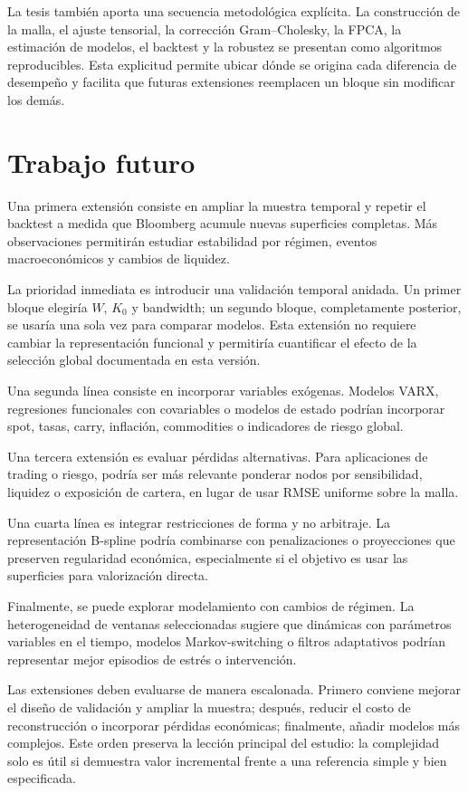 \documentclass[a4paper,11pt]{article}
\begin{document}
La tesis también aporta una secuencia metodológica explícita. La construcción de la malla, el ajuste tensorial, la corrección Gram--Cholesky, la FPCA, la estimación de modelos, el backtest y la robustez se presentan como algoritmos reproducibles. Esta explicitud permite ubicar dónde se origina cada diferencia de desempeño y facilita que futuras extensiones reemplacen un bloque sin modificar los demás.

\section{Trabajo futuro}

Una primera extensión consiste en ampliar la muestra temporal y repetir el backtest a medida que Bloomberg acumule nuevas superficies completas. Más observaciones permitirán estudiar estabilidad por régimen, eventos macroeconómicos y cambios de liquidez.

La prioridad inmediata es introducir una validación temporal anidada. Un primer bloque elegiría \(W\), \(K_0\) y bandwidth; un segundo bloque, completamente posterior, se usaría una sola vez para comparar modelos. Esta extensión no requiere cambiar la representación funcional y permitiría cuantificar el efecto de la selección global documentada en esta versión.

Una segunda línea consiste en incorporar variables exógenas. Modelos VARX, regresiones funcionales con covariables o modelos de estado podrían incorporar spot, tasas, carry, inflación, commodities o indicadores de riesgo global.

Una tercera extensión es evaluar pérdidas alternativas. Para aplicaciones de trading o riesgo, podría ser más relevante ponderar nodos por sensibilidad, liquidez o exposición de cartera, en lugar de usar RMSE uniforme sobre la malla.

Una cuarta línea es integrar restricciones de forma y no arbitraje. La representación B-spline podría combinarse con penalizaciones o proyecciones que preserven regularidad económica, especialmente si el objetivo es usar las superficies para valorización directa.

Finalmente, se puede explorar modelamiento con cambios de régimen. La heterogeneidad de ventanas seleccionadas sugiere que dinámicas con parámetros variables en el tiempo, modelos Markov-switching o filtros adaptativos podrían representar mejor episodios de estrés o intervención.

Las extensiones deben evaluarse de manera escalonada. Primero conviene mejorar el diseño de validación y ampliar la muestra; después, reducir el costo de reconstrucción o incorporar pérdidas económicas; finalmente, añadir modelos más complejos. Este orden preserva la lección principal del estudio: la complejidad solo es útil si demuestra valor incremental frente a una referencia simple y bien especificada.
\end{document}
